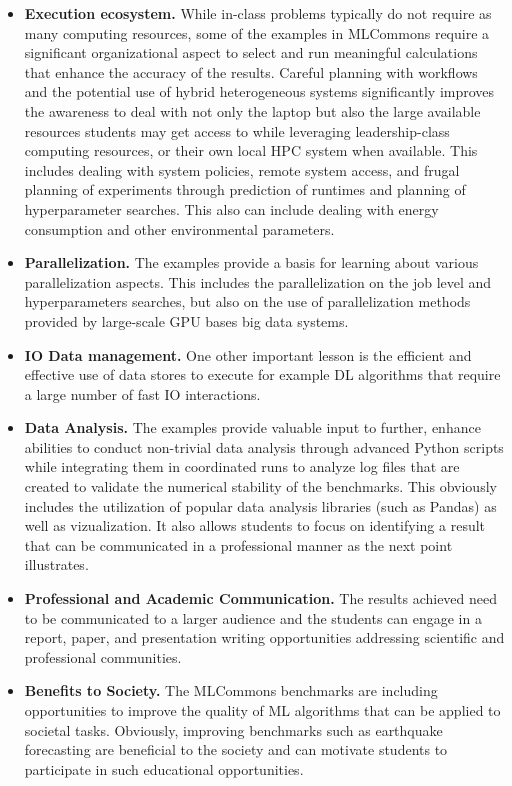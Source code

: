 \documentclass[utf8]{FrontiersinVancouver} %
\begin{document}
\begin{itemize}
  \item {\bf Execution ecosystem.} While in-class problems typically
    do not require as many computing resources, some of the examples in
    MLCommons require a significant organizational aspect to select
    and run meaningful calculations that enhance the accuracy of the
    results. Careful planning with workflows and the potential use
    of hybrid heterogeneous systems significantly improves the
    awareness to deal with not only the laptop but also the large
    available resources students may get access to while leveraging
    leadership-class computing resources, or their own local HPC
    system when available. This includes dealing with system policies,
    remote system access, and frugal planning of experiments through
    prediction of runtimes and planning of hyperparameter searches. This
    also can include dealing with energy consumption and other
    environmental parameters.

  \item {\bf Parallelization.} The examples provide a basis for
    learning about various parallelization aspects. This includes the
    parallelization on the job level and hyperparameters searches, but
    also on the use of parallelization methods provided by large-scale
    GPU bases big data systems.

  \item {\bf IO Data management.} One other important lesson is the
    efficient and effective use of data stores to execute for example
    DL algorithms that require a large number of fast IO interactions.

  \item {\bf Data Analysis.} The examples provide valuable input to
    further, enhance abilities to conduct non-trivial data analysis
    through advanced Python scripts while integrating them in
    coordinated runs to analyze log files that are created to
    validate the numerical stability of the benchmarks. This obviously
    includes the utilization of popular data analysis libraries (such
    as Pandas) as well as vizualization. It also allows students to
    focus on identifying a result that can be communicated in a
    professional manner as the next point illustrates.


  \item {\bf Professional and Academic Communication.} The results
    achieved need to be communicated to a larger audience and the
    students can engage in a report, paper, and
    presentation writing opportunities addressing scientific and
    professional communities.

  \item {\bf Benefits to Society.} The MLCommons benchmarks are
    including opportunities to improve the quality of ML algorithms
    that can be applied to societal tasks. Obviously, improving
    benchmarks such as earthquake forecasting are beneficial to the
    society and can motivate students to participate in such
    educational opportunities.

\end{itemize}
\end{document}

